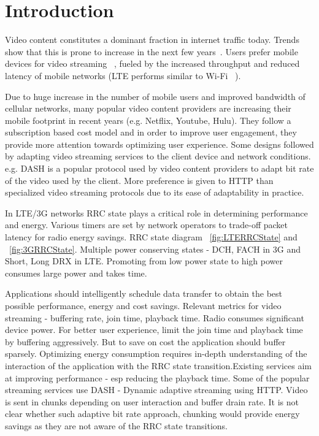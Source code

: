 \section{Introduction}
Video content constitutes a dominant fraction in internet traffic today. Trends show that this is prone to increase in the next few years~\cite{}.
Users prefer mobile devices for video streaming ~\cite{}, fueled by the increased throughput and reduced latency of mobile networks (LTE performs similar to Wi-Fi ~\cite{LTEPaper}).


Due to huge increase in the number of mobile users and improved bandwidth of cellular networks, many popular video content providers are increasing their mobile footprint in recent years (e.g. Netflix, Youtube, Hulu).
They follow a subscription based cost model and in order to improve user engagement, they provide more attention towards optimizing user experience. Some designs followed by adapting video streaming services to the client device and network conditions. e.g. DASH is a popular protocol used by video content providers to adapt bit rate of the video used by the client. 
More preference is given to HTTP than specialized video streaming protocols due to its ease of adaptability in practice.  
 
In LTE/3G networks RRC state plays a critical role in determining performance and energy. Various timers are set by network operators to trade-off packet latency for radio energy savings. RRC state diagram ~\ref{fig:LTERRCState} and ~\ref{fig:3GRRCState}. Multiple power conserving states - DCH, FACH in 3G and Short, Long DRX in LTE. Promoting from low power state to high power consumes large power and takes time.    

Applications should intelligently schedule data transfer to obtain the best possible performance, energy and cost savings. Relevant metrics for video streaming - buffering rate, join time, playback time. Radio consumes significant device power. For better user experience, limit the join time and playback time by buffering aggressively. But to save on cost the application should buffer sparsely. Optimizing energy consumption requires in-depth understanding of the interaction of the application with the RRC state transition.Existing services aim at improving performance - esp reducing the playback time. Some of the popular streaming services use DASH - Dynamic adaptive streaming using HTTP. Video is sent in chunks depending on user interaction and buffer drain rate. It is not clear whether such adaptive bit rate approach, chunking would provide energy savings as they are not aware of the RRC state transitions.           

